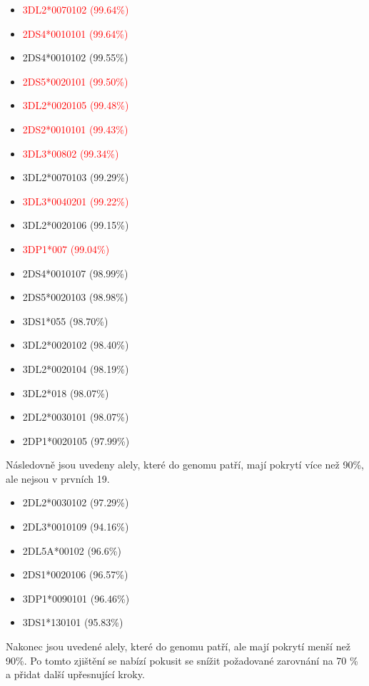\documentclass[czech,DP]{thesiskiv}
\numberwithin{equation}{section}
\begin{document}
\begin{multicols}{2}
\begin{itemize}
	\itemsep0em
	\item \textcolor{red}{3DL2*0070102 (99.64\%) }
	\item \textcolor{red}{2DS4*0010101 (99.64\%) }
	\item 2DS4*0010102 (99.55\%)
	\item \textcolor{red}{2DS5*0020101 (99.50\%) }
	\item \textcolor{red}{3DL2*0020105 (99.48\%) }
	\item \textcolor{red}{2DS2*0010101 (99.43\%) }
	\item \textcolor{red}{3DL3*00802 (99.34\%) }
	\item 3DL2*0070103 (99.29\%) 
	\item \textcolor{red}{3DL3*0040201 (99.22\%) }
	\item 3DL2*0020106 (99.15\%)
	\item \textcolor{red}{3DP1*007 (99.04\%) }
	\item 2DS4*0010107 (98.99\%)
	\item 2DS5*0020103 (98.98\%)
	\item 3DS1*055 (98.70\%)
	\item 3DL2*0020102 (98.40\%)
	\item 3DL2*0020104 (98.19\%)
	\item 3DL2*018 (98.07\%)
	\item 2DL2*0030101 (98.07\%)
	\item 2DP1*0020105 (97.99\%)
\end{itemize}
\end{multicols}

\noindent
Následovně jsou uvedeny alely, které do genomu patří, mají pokrytí více než 90\%, ale nejsou v prvních 19.
\begin{multicols}{2}
\begin{itemize}
	\itemsep0em
	\item 2DL2*0030102 (97.29\%)
	\item 2DL3*0010109 (94.16\%)
	\item 2DL5A*00102 (96.6\%)
	\item 2DS1*0020106 (96.57\%)
	\item 3DP1*0090101 (96.46\%)
	\item 3DS1*130101 (95.83\%)
\end{itemize}
\end{multicols}


\noindent
Nakonec jsou uvedené alely, které do genomu patří, ale mají pokrytí menší než 90\%. Po tomto zjištění se nabízí pokusit se snížit požadované zarovnání na 70 \% a přidat další upřesnující kroky.
\end{document}
